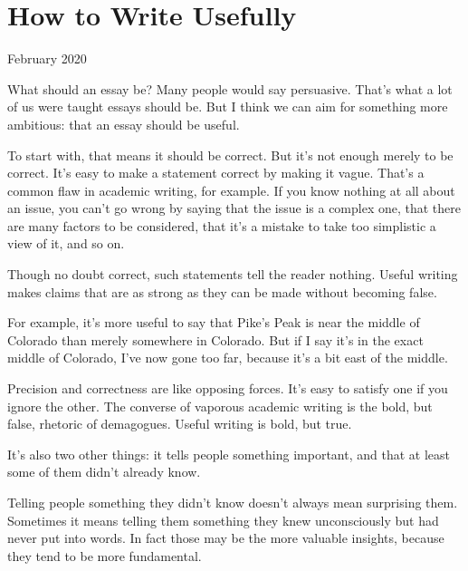 \chapter{How to Write Usefully}


            
              
                

February 2020

What should an essay be? Many people
                  would say persuasive. That's what a lot of us were taught
                  essays should be. But I think we can aim for something more
                  ambitious: that an essay should be useful.

To start
                  with, that means it should be correct. But it's not enough
                  merely to be correct. It's easy to make a statement correct by
                  making it vague. That's a common flaw in academic writing, for
                  example. If you know nothing at all about an issue, you can't
                  go wrong by saying that the issue is a complex one, that there
                  are many factors to be considered, that it's a mistake to take
                  too simplistic a view of it, and so on.

Though no
                  doubt correct, such statements tell the reader nothing. Useful
                  writing makes claims that are as strong as they can be made
                  without becoming false.

For example, it's more
                  useful to say that Pike's Peak is near the middle of Colorado
                  than merely somewhere in Colorado. But if I say it's in the
                  exact middle of Colorado, I've now gone too far, because it's
                  a bit east of the middle.

Precision and correctness
                  are like opposing forces. It's easy to satisfy one if you
                  ignore the other. The converse of vaporous academic writing is
                  the bold, but false, rhetoric of demagogues. Useful writing is
                  bold, but true.

It's also two other things: it
                  tells people something important, and that at least some of
                  them didn't already know.

Telling people something
                  they didn't know doesn't always mean surprising them.
                  Sometimes it means telling them something they knew
                  unconsciously but had never put into words. In fact those may
                  be the more valuable insights, because they tend to be more
                  fundamental.

